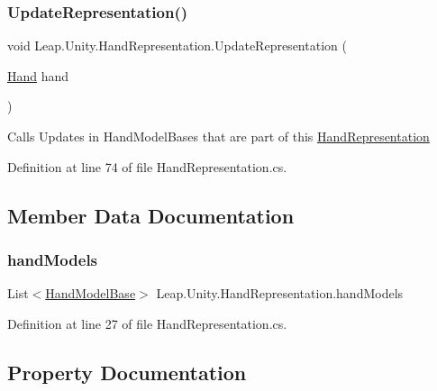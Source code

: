 \subsubsection{\texorpdfstring{UpdateRepresentation()}{UpdateRepresentation()}}
{\footnotesize\ttfamily void Leap.\+Unity.\+Hand\+Representation.\+Update\+Representation (\begin{DoxyParamCaption}\item[{\mbox{\hyperlink{class_leap_1_1_hand}{Hand}}}]{hand }\end{DoxyParamCaption})}

Calls Updates in Hand\+Model\+Bases that are part of this \mbox{\hyperlink{class_leap_1_1_unity_1_1_hand_representation}{Hand\+Representation}} 

Definition at line 74 of file Hand\+Representation.\+cs.



\subsection{Member Data Documentation}
\mbox{\label{class_leap_1_1_unity_1_1_hand_representation_ab74a6ece88663f24aac02b88a750b1e3}} 
\subsubsection{\texorpdfstring{handModels}{handModels}}
{\footnotesize\ttfamily List$<$\mbox{\hyperlink{class_leap_1_1_unity_1_1_hand_model_base}{Hand\+Model\+Base}}$>$ Leap.\+Unity.\+Hand\+Representation.\+hand\+Models}



Definition at line 27 of file Hand\+Representation.\+cs.



\subsection{Property Documentation}
\mbox{\label{class_leap_1_1_unity_1_1_hand_representation_a30e2f951969acdc0cabd3e6ba2661241}} 
